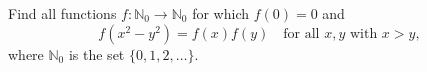 \documentclass[varwidth]{standalone}
\begin{document}
    Find all functions $f: \mathbb{N}_0 \to \mathbb{N}_0$ for which $f(0) = 0$ and
    \[
        f(x^2 - y^2) = f(x) f(y) \quad \text{for all } x, y \text{ with } x > y,  
    \]
    where $\mathbb{N}_0$ is the set $\{0, 1, 2, \dots\}$.
\end{document}
